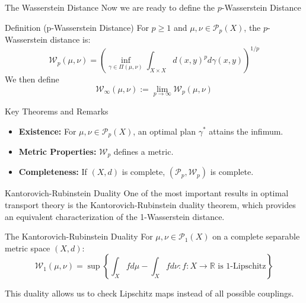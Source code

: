\documentclass{beamer}
\begin{document}
\begin{frame}{The Wasserstein Distance}
  Now we are ready to define the $p$-Wasserstein Distance
  \begin{block}{Definition (p-Wasserstein Distance)}
    For $p \geq 1$ and $\mu, \nu \in \mathcal{P}_p(X)$, the $p$-Wasserstein distance is:
    \[
      \mathcal{W}_p(\mu, \nu) = \left(\inf_{\gamma \in \Pi(\mu, \nu)} \int_{X \times X} d(x, y)^p d\gamma(x, y)\right)^{1/p}
    \]
    We then define \[
    \mathcal{W}_\infty (\mu, \nu) := \lim \limits _{p \to \infty} \mathcal{W}_p (\mu, \nu)
    \]
  \end{block}
\end{frame}

\begin{frame}{Key Theorems and Remarks}
  \begin{itemize}
    \item \textbf{Existence:} For $\mu, \nu \in \mathcal{P}_p(X)$, an optimal plan $\gamma^\ast$ attains the infimum.
    \item \textbf{Metric Properties:} $\mathcal{W}_p$ defines a metric.
    \item \textbf{Completeness:} If $(X, d)$ is complete, $(\mathcal{P}_p, \mathcal{W}_p)$ is complete. 
  \end{itemize}
\end{frame}

\begin{frame}{Kantorovich-Rubinstein Duality}
  One of the most important results in optimal transport theory is the Kantorovich-Rubinstein duality theorem, which provides an equivalent characterization of the 1-Wasserstein distance.
  \begin{block}{The Kantorovich-Rubinstein Duality}
    For $\mu, \nu \in \mathcal{P}_1(X)$ on a complete separable metric space $(X, d)$:
    \[
      \mathcal{W}_1(\mu, \nu) = \sup\left\{\int_X f d\mu - \int_X f d\nu : f : X \to \mathbb{R} \text{ is 1-Lipschitz}\right\}
    \]
  \end{block}
  This duality allows us to check Lipschitz maps instead of all possible couplings.
\end{frame}
\end{document}

